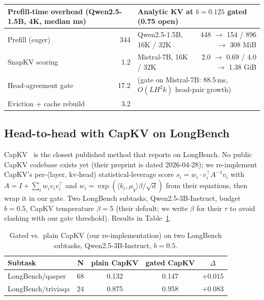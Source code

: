\documentclass{article}
\begin{document}
\begin{table}[t]
\vspace{0.6em}

\small
\setlength{\tabcolsep}{4pt}
\begin{tabular}{lrlr}
\toprule
\multicolumn{2}{l}{Prefill-time overhead (Qwen2.5-1.5B, 4K, median ms)} &
\multicolumn{2}{l}{Analytic KV at $b{=}0.125$ gated (0.75 open)} \\
\midrule
Prefill (eager)            & 344  & Qwen2.5-1.5B, 16K / 32K & 448 $\to$ 154 / 896 $\to$ 308 MiB \\
SnapKV scoring             & 1.2  & Mistral-7B, 16K / 32K   & 2.0 $\to$ 0.69 / 4.0 $\to$ 1.38 GiB \\
Head-agreement gate        & 17.2 & \multicolumn{2}{l}{(gate on Mistral-7B: 88.5\,ms, $O(LH^2k)$ head-pair growth)} \\
Eviction + cache rebuild   & 3.2  & & \\
\bottomrule
\end{tabular}
\end{table}

\subsection{Head-to-head with CapKV on LongBench}
\label{subsec:capkv-longbench}

CapKV~\citep{arxiv260425975} is the closest published method that
reports on LongBench. No public CapKV codebase exists yet (their
preprint is dated 2026-04-28); we re-implement CapKV's per-(layer, kv-head)
statistical-leverage score $s_i = w_i \cdot v_i^\top A^{-1} v_i$ with
$A = I + \sum_i w_i v_i v_i^\top$ and $w_i = \exp(\langle k_i,
\mu_q\rangle \beta / \sqrt d)$ from their equations,
then wrap it in our gate. Two
LongBench subtasks, Qwen2.5-3B-Instruct, budget $b = 0.5$, CapKV
temperature $\beta = 5$ (their default; we write $\beta$ for their
$\tau$ to avoid clashing with our gate threshold). Results in
Table~\ref{tab:capkv}.

\begin{table}[h]
\centering
\caption{Gated vs.\ plain CapKV (our re-implementation) on two
LongBench subtasks, Qwen2.5-3B-Instruct, $b = 0.5$.}
\label{tab:capkv}
\begin{tabular}{lcccc}
\toprule
Subtask & N & plain CapKV & gated CapKV & $\Delta$ \\
\midrule
LongBench/qasper   & 68 & 0.132 & 0.147 & $+0.015$ \\
LongBench/triviaqa & 24 & 0.875 & 0.958 & $+0.083$ \\
\bottomrule
\end{tabular}
\end{table}
\end{document}
